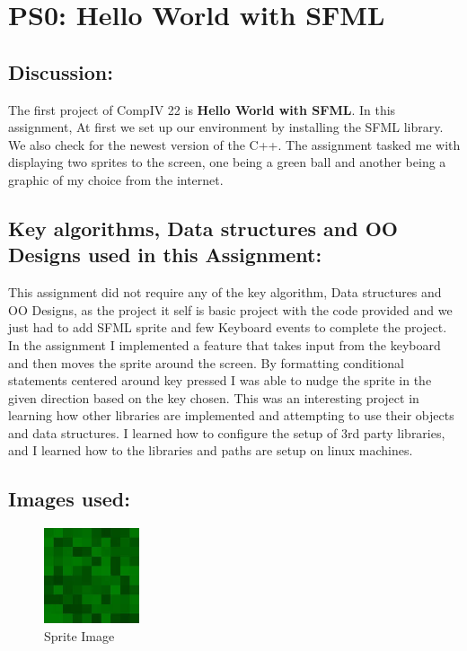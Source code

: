 \section{PS0: Hello World with SFML}\label{sec:ps0}
\graphicspath{{ps0}}
\subsection{Discussion:}\label{sec:ps0:disc}
 
       
 
    The first project of CompIV 22 is \textbf{Hello World with SFML}. In this assignment, At first we set up our environment by installing the SFML library. We also check for the newest version of the C++.  The assignment tasked me with displaying two sprites to the screen, one being a green ball and another being a graphic of my choice from the internet.  

\subsection{Key algorithms, Data structures and OO Designs used in this Assignment:}\label{sec:ps0:kdo}

    This assignment did not require any of the key algorithm, Data structures and OO Designs, as the project it self is basic project with the code provided and we just had to add SFML sprite and few Keyboard events to complete the project. In the assignment I implemented a feature that takes input from the keyboard and then moves the sprite around the screen. By formatting conditional statements centered around key pressed I was able to nudge the sprite in the given direction based on the key chosen. This was an interesting project in learning how other libraries are implemented and attempting to use their objects and data structures. I learned how to configure the setup of 3rd party libraries, and I learned how to the libraries and paths are setup on linux machines. 


\subsection{Images used:}\label{sec:ps0:img}
\begin{figure}[h]
    \centering
    \includegraphics[width=0.25\textwidth]{ps0/sprite.jpg}
    \caption{Sprite Image}
    \label{fig:mesh1}
\end{figure}

